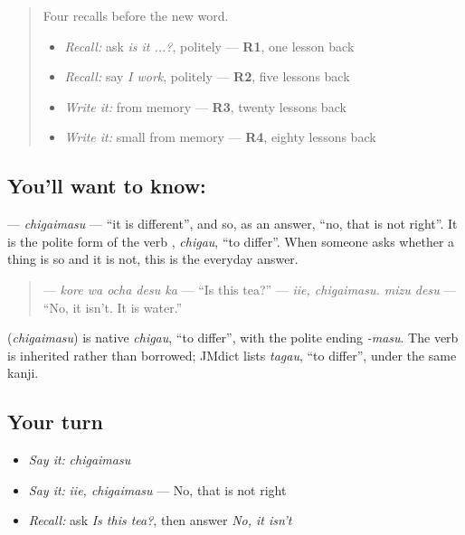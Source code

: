 \label{lesson:JA-C139-chigaimasu}



\begin{quote}
Four recalls before the new word.

\begin{itemize}
\raggedright
  \item \emph{Recall:} ask \emph{is it ...?}, politely — \textbf{R1}, one lesson back
  \item \emph{Recall:} say \emph{I work}, politely — \textbf{R2}, five lessons back
  \item \emph{Write it:} \textbf{} from memory — \textbf{R3}, twenty lessons back
  \item \emph{Write it:} small \textbf{} from memory — \textbf{R4}, eighty lessons back
\end{itemize}
\end{quote}

\subsection*{You'll want to know: }
\textbf{} — \emph{chigaimasu} — \textquotedblleft{}it is different\textquotedblright{}, and so, as an answer, \textquotedblleft{}no, that is not right\textquotedblright{}. It is the polite form of the verb \textbf{}, \emph{chigau}, \textquotedblleft{}to differ\textquotedblright{}. When someone asks whether a thing is so and it is not, this is the everyday answer.

\begin{quote}
\textbf{ } — \emph{kore wa ocha desu ka} — \textquotedblleft{}Is this tea?\textquotedblright{} \textbf{} — \emph{iie, chigaimasu. mizu desu} — \textquotedblleft{}No, it isn't. It is water.\textquotedblright{}
\end{quote}

\begin{cousinweb}
\textbf{} (\emph{chigaimasu}) is native \emph{chigau}, \textquotedblleft{}to differ\textquotedblright{}, with the polite ending \emph{-masu}. The verb is inherited rather than borrowed; JMdict lists \emph{tagau}, \textquotedblleft{}to differ\textquotedblright{}, under the same kanji.
\end{cousinweb}

\subsection*{Your turn}
\begin{itemize}
\raggedright
  \item \emph{Say it:} \emph{chigaimasu}
  \item \emph{Say it:} \emph{iie, chigaimasu} — No, that is not right
  \item \emph{Recall:} ask \emph{Is this tea?}, then answer \emph{No, it isn't}
\end{itemize}

